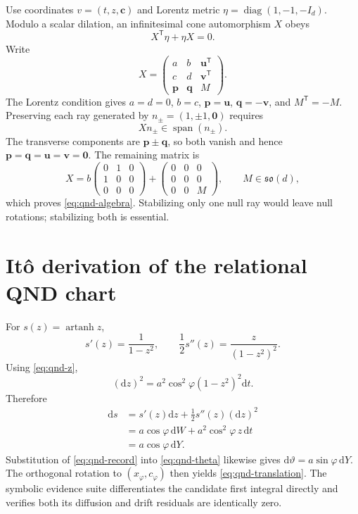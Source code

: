 \documentclass[10pt]{article}
\theoremstyle{definition}
\theoremstyle{remark}
\newcommand{\artanh}{\operatorname{artanh}}
\newcommand{\dd}{\mathrm d}
\begin{document}
Use coordinates \(v=(t,z,\bm c)\) and Lorentz metric
\(\eta=\operatorname{diag}(1,-1,-I_d)\).
Modulo a scalar dilation, an infinitesimal cone automorphism \(X\) obeys
\[
X^\mathsf T\eta+\eta X=0.
\]
Write
\[
X=
\begin{pmatrix}
a & b & \bm u^\mathsf T\\
c & d & \bm v^\mathsf T\\
\bm p & \bm q & M
\end{pmatrix}.
\]
The Lorentz condition gives \(a=d=0\), \(b=c\), \(\bm p=\bm u\), \(\bm q=-\bm v\), and \(M^\mathsf T=-M\). Preserving each ray generated by \(n_\pm=(1,\pm1,\bm0)\) requires
\[
Xn_\pm\in\operatorname{span}(n_\pm).
\]
The transverse components are \(\bm p\pm\bm q\), so both vanish and hence \(\bm p=\bm q=\bm u=\bm v=\bm0\). The remaining matrix is
\[
X=
b
\begin{pmatrix}
0&1&0\\
1&0&0\\
0&0&0
\end{pmatrix}
+
\begin{pmatrix}
0&0&0\\
0&0&0\\
0&0&M
\end{pmatrix},
\qquad M\in\mathfrak{so}(d),
\]
which proves \cref{eq:qnd-algebra}. Stabilizing only one null ray would leave null rotations; stabilizing both is essential.

\section{It\^o derivation of the relational QND chart}
\label{app:ito}

For \(s(z)=\artanh z\),
\[
s'(z)=\frac{1}{1-z^2},
\qquad
\frac12s''(z)=\frac{z}{(1-z^2)^2}.
\]
Using \cref{eq:qnd-z},
\[
(\dd z)^2=a^2\cos^2\varphi(1-z^2)^2\dd t.
\]
Therefore
\begin{align*}
\dd s
&=s'(z)\dd z+\frac12s''(z)(\dd z)^2\\
&=a\cos\varphi\,\dd W
+a^2\cos^2\varphi\,z\,\dd t\\
&=a\cos\varphi\,\dd Y.
\end{align*}
Substitution of \cref{eq:qnd-record} into \cref{eq:qnd-theta} likewise gives
\(\dd\vartheta=a\sin\varphi\,\dd Y\). The orthogonal rotation to \((x_\varphi,c_\varphi)\) then yields \cref{eq:qnd-translation}. The symbolic evidence suite differentiates the candidate first integral directly and verifies both its diffusion and drift residuals are identically zero.
\end{document}
